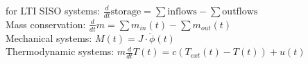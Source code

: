 for LTI SISO systems: $\frac{d}{dt} \text{storage} = \sum \text{inflows} - \sum \text{outflows}$\\
Mass conservation: $\frac{d}{dt} m = \sum m_{in}(t) - \sum m_{out}(t)$\\
Mechanical systems: $M(t) = J \cdot \ddot{\phi}(t)$\\
Thermodynamic systems: $m \frac{d}{dt} T(t) = c(T_{ext}(t) -T(t)) + u(t)$